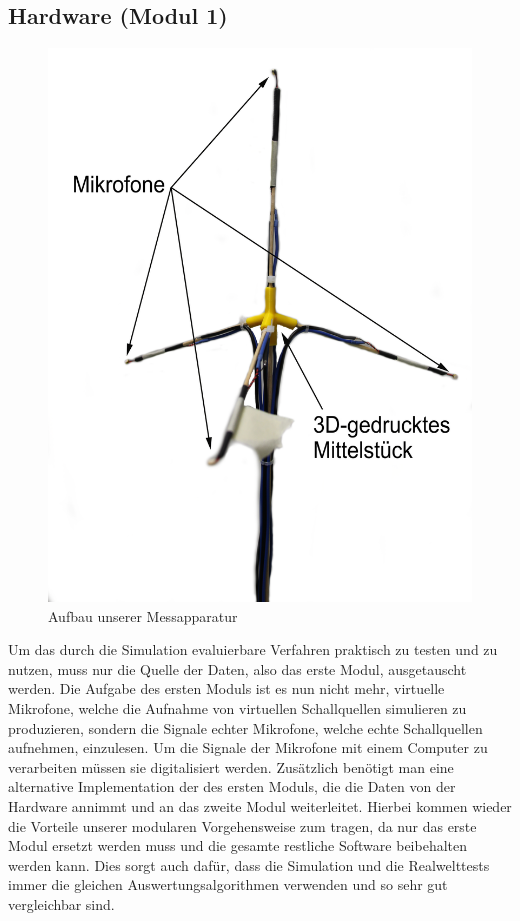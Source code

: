 \subsection{Hardware (Modul 1)}
\begin{figure}
	\centering
	\includegraphics[width=\linewidth]{img/tet}
	\caption{Aufbau unserer Messapparatur}
\end{figure}
Um das durch die Simulation evaluierbare Verfahren praktisch zu testen und zu nutzen, muss nur die Quelle der Daten, also das erste Modul, ausgetauscht werden. Die Aufgabe des ersten Moduls ist es nun nicht mehr, virtuelle Mikrofone, welche die Aufnahme von virtuellen Schallquellen simulieren zu produzieren, sondern die Signale echter Mikrofone, welche echte Schallquellen aufnehmen, einzulesen. Um die Signale der Mikrofone mit einem Computer zu verarbeiten müssen sie digitalisiert werden. Zusätzlich benötigt man eine alternative Implementation der des ersten Moduls, die die Daten von der Hardware annimmt und an das zweite Modul weiterleitet. Hierbei kommen wieder die Vorteile unserer modularen Vorgehensweise zum tragen, da nur das erste Modul ersetzt werden muss und die gesamte restliche Software beibehalten werden kann. Dies sorgt auch dafür, dass die Simulation und die Realwelttests immer die gleichen Auswertungsalgorithmen verwenden und so sehr gut vergleichbar sind.
